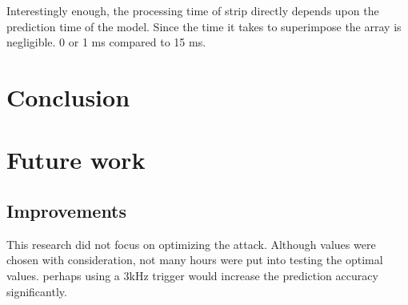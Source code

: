 \documentclass{report}
\theoremstyle{definition}
\theoremstyle{remark}
\begin{document}
Interestingly enough, the processing time of strip directly depends upon the prediction time of the model. Since the time it takes to superimpose the array is negligible. 0 or 1 ms compared to 15 ms. 
\chapter{Conclusion}
\chapter{Future work}
\section{Improvements}
This research did not focus on optimizing the attack. Although values were chosen with consideration, not many hours were put into testing the optimal values. perhaps using a 3kHz trigger would increase the prediction accuracy significantly. 
\newpage


\end{document}
